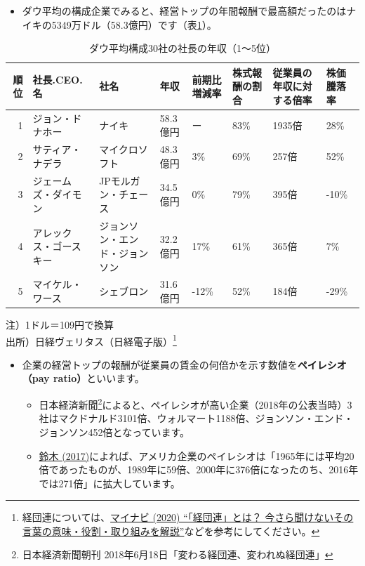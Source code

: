 \documentclass[
]{book}
\providecommand{\tightlist}{%
  \setlength{\itemsep}{0pt}\setlength{\parskip}{0pt}}
\begin{document}
\begin{itemize}
\tightlist
\item
  ダウ平均の構成企業でみると、経営トップの年間報酬で最高額だったのはナイキの5349万ドル（58.3億円）です（表\ref{tab:uspay}）。
\end{itemize}

\begin{table}

\caption{\label{tab:uspay}ダウ平均構成30社の社長の年収（1～5位）}
\centering
\begin{tabular}[t]{r|l|l|l|l|l|l|l}
\hline
順位 & 社長.CEO.名 & 社名 & 年収 & 前期比増減率 & 株式報酬の割合 & 従業員の年収に対する倍率 & 株価騰落率\\
\hline
1 & ジョン・ドナホー & ナイキ & 58.3億円 & ー & 83\% & 1935倍 & 28\%\\
\hline
2 & サティア・ナデラ & マイクロソフト & 48.3億円 & 3\% & 69\% & 257倍 & 52\%\\
\hline
3 & ジェームズ・ダイモン & JPモルガン・チェース & 34.5億円 & 0\% & 79\% & 395倍 & -10\%\\
\hline
4 & アレックス・ゴースキー & ジョンソン・エンド・ジョンソン & 32.2億円 & 17\% & 61\% & 365倍 & 7\%\\
\hline
5 & マイケル・ワース & シェブロン & 31.6億円 & -12\% & 52\% & 184倍 & -29\%\\
\hline
\end{tabular}
\end{table}

注）1ドル＝109円で換算\\
出所）日経ヴェリタス（日経電子版）\footnote{経団連については、\href{https://gakumado.mynavi.jp/style/articles/46464}{マイナビ (2020) ``「経団連」とは？ 今さら聞けないその言葉の意味・役割・取り組みを解説''}などを参考にしてください。}

\begin{itemize}
\item
  企業の経営トップの報酬が従業員の賃金の何倍かを示す数値を\textbf{ペイレシオ（pay ratio）}といいます。

  \begin{itemize}
  \item
    日本経済新聞\footnote{日本経済新聞朝刊 2018年6月18日「変わる経団連、変われぬ経団連」}によると、ペイレシオが高い企業（2018年の公表当時）3社はマクドナルド3101倍、ウォルマート1188倍、ジョンソン・エンド・ジョンソン452倍となっています。
  \item
    \href{https://www.dir.co.jp/report/column/20170921_012304.html}{鈴木 (2017)}によれば、アメリカ企業のペイレシオは「1965年には平均20倍であったものが、1989年に59倍、2000年に376倍になったのち、2016年では271倍」に拡大しています。
  \end{itemize}
\end{itemize}
\end{document}
